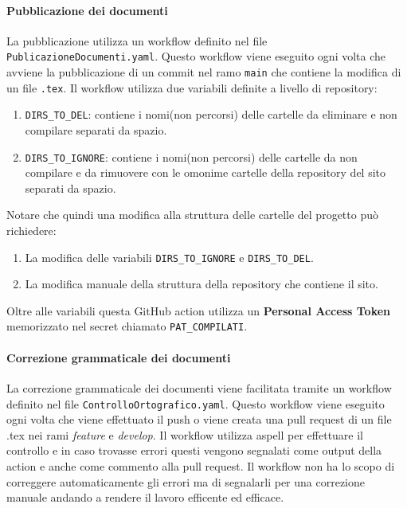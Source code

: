 \paragraph{Pubblicazione dei documenti}
\label{par:pubblicazione_documenti}
La pubblicazione utilizza un workflow definito nel file \texttt{PublicazioneDocumenti.yaml}.
Questo workflow viene eseguito ogni volta che avviene la pubblicazione di un commit nel ramo \texttt{main} che contiene la modifica di un file \texttt{.tex}.
Il workflow utilizza due variabili definite a livello di repository:
\begin{enumerate}
    \item \texttt{DIRS\_TO\_DEL}: contiene i nomi(non percorsi) delle cartelle da eliminare e non compilare separati da spazio.
    \item \texttt{DIRS\_TO\_IGNORE}: contiene i nomi(non percorsi) delle cartelle da non compilare e da rimuovere con le omonime cartelle della repository del sito separati da spazio.
\end{enumerate}
Notare che quindi una modifica alla struttura delle cartelle del progetto può richiedere:
\begin{enumerate}
    \item La modifica delle variabili \texttt{DIRS\_TO\_IGNORE} e \texttt{DIRS\_TO\_DEL}.
    \item La modifica manuale della struttura della repository che contiene il sito.
\end{enumerate}
Oltre alle variabili questa GitHub action utilizza un \textbf{Personal Access Token} memorizzato nel secret chiamato \texttt{PAT\_COMPILATI}.

\paragraph{Correzione grammaticale dei documenti}
\label{par:correzione_grammaticale}
La correzione grammaticale dei documenti viene facilitata tramite un workflow definito nel file \texttt{ControlloOrtografico.yaml}.
Questo workflow viene eseguito ogni volta che viene effettuato il push o viene creata una pull request di un file .tex nei rami \textit{feature} e \textit{develop}.
Il workflow utilizza aspell per effettuare il controllo e in caso trovasse errori questi vengono segnalati come output della action e anche come commento alla pull request.
Il workflow non ha lo scopo di correggere automaticamente gli errori ma di segnalarli per una correzione manuale andando a rendere il lavoro efficente ed efficace. 


